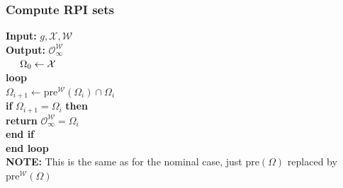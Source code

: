     \subsubsection{Compute RPI sets}
    \textbf{Input: }$g,\mathcal{X,W}$\\
    \textbf{Output: }$\mathcal{O}^\mathcal{W}_\infty$\\
        $\hspace*{5mm} \Omega_0 \leftarrow \mathcal{X}$\\
         \hspace*{5mm}\textbf{loop}\\
         \hspace*{8mm}$\Omega_{i+1} \leftarrow \textrm{pre}^\mathcal{W}(\Omega_i) \cap\Omega_i$\\
         \hspace*{8mm}\textbf{if }$\Omega_{i+1} = \Omega_i$ \textbf{then}\\
         \hspace*{10mm}\textbf{return} $\mathcal{O} ^\mathcal{W}_\infty = \Omega_i$\\
         \hspace*{8mm}\textbf{end if}\\
         \hspace*{5mm}\textbf{end loop}\\
    \textbf{NOTE:} This is the same as for the nominal case, just $\mathrm{pre}(\Omega)$ replaced by $\mathrm{pre}^\mathcal{W}(\Omega)$
         
        